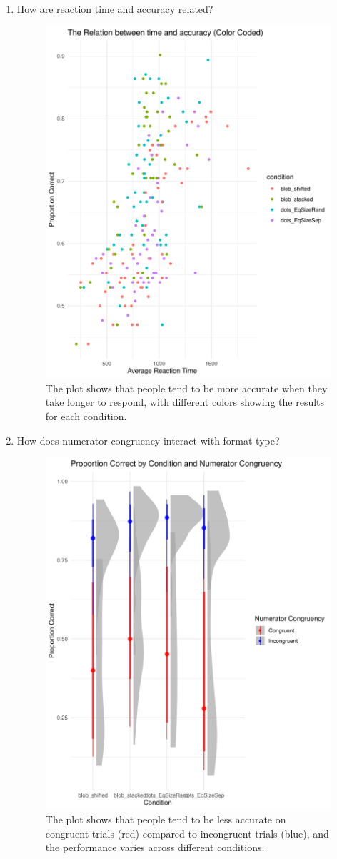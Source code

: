 \documentclass[
  man,floatsintext]{apa6}
\providecommand{\tightlist}{%
  \setlength{\itemsep}{0pt}\setlength{\parskip}{0pt}}
\begin{document}
\begin{enumerate}
\def\labelenumi{\arabic{enumi}.}
\setcounter{enumi}{1}
\tightlist
\item
  How are reaction time and accuracy related?

  \begin{figure}
  \includegraphics[width=0.7\linewidth]{Curi_11_files/figure-latex/plottwo-1} \caption{The plot shows that people tend to be more accurate when they take longer to respond, with different colors showing the results for each condition.}\label{fig:plottwo}
  \end{figure}
  \newpage
\item
  How does numerator congruency interact with format type?

  \begin{figure}
  \includegraphics[width=0.7\linewidth]{Curi_11_files/figure-latex/plotthree-1} \caption{The plot shows that people tend to be less accurate on congruent trials (red) compared to incongruent trials (blue), and the performance varies across different conditions.}\label{fig:plotthree}
  \end{figure}
\end{enumerate}
\end{document}
